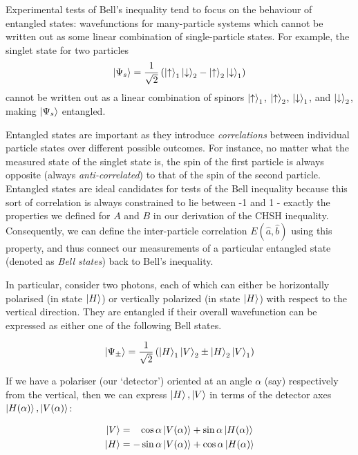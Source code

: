 \documentclass[aps,prl,nofootinbib,twocolumn,superscriptaddress,groupedaddress]{revtex4}  %
\begin{document}
Experimental tests of Bell's inequality tend to focus on the behaviour of entangled states: wavefunctions for many-particle systems which cannot be written out as some linear combination of single-particle states. For example, the singlet state for two particles 
\begin{equation}
\ket{\Psi_{s}} = \dfrac{1}{\sqrt{2}}\left(\ket{\uparrow}_{1}\ket{\downarrow}_{2} - \ket{\uparrow}_{2}\ket{\downarrow}_{1}\right)
\end{equation}
cannot be written out as a linear combination of spinors $\ket{\uparrow}_{1}$, $\ket{\uparrow}_{2}$, $\ket{\downarrow}_{1}$, and $\ket{\downarrow}_{2}$, making $\ket{\Psi_{s}}$ entangled. 

Entangled states are important as they introduce \textsl{correlations} between individual particle states over different possible outcomes. For instance, no matter what the measured state of the singlet state is, the spin of the first particle is always opposite (always \textit{anti-correlated}) to that of the spin of the second particle. Entangled states are ideal candidates for tests of the Bell inequality because this sort of correlation is always constrained to lie between -1 and 1 - exactly the properties we defined for $A$ and $B$ in our derivation of the CHSH inequality. Consequently, we can define the inter-particle correlation $E(\hat{a},\hat{b})$ using this property, and thus connect our measurements of a particular entangled state (denoted as \textsl{Bell states}) back to Bell's inequality.

In particular, consider two photons, each of which can either be horizontally polarised (in state $\ket{H}$) or vertically polarized (in state $\ket{H}$) with respect to the vertical direction. They are entangled if their overall wavefunction can be expressed as either one of the following Bell states.

\begin{equation}
\ket{\Psi_{\pm}} = \dfrac{1}{\sqrt{2}}\left(\ket{H}_{1}\ket{V}_{2} \pm \ket{H}_{2}\ket{V}_{1}\right)
\end{equation}

If we have a polariser (our `detector') oriented at an angle $\alpha$ (say) respectively from the vertical, then we can express $\ket{H}, \ket{V}$ in terms of the detector axes $\ket{H(\alpha)}, \ket{V(\alpha)}$:

\begin{align}
\ket{V} &= \;\;\;\cos{\alpha}\ket{V(\alpha)}+\sin{\alpha}\ket{H(\alpha)}\\
\ket{H} &= -\sin{\alpha}\ket{V(\alpha)}+\cos{\alpha}\ket{H(\alpha)}
\end{align}
\end{document}
